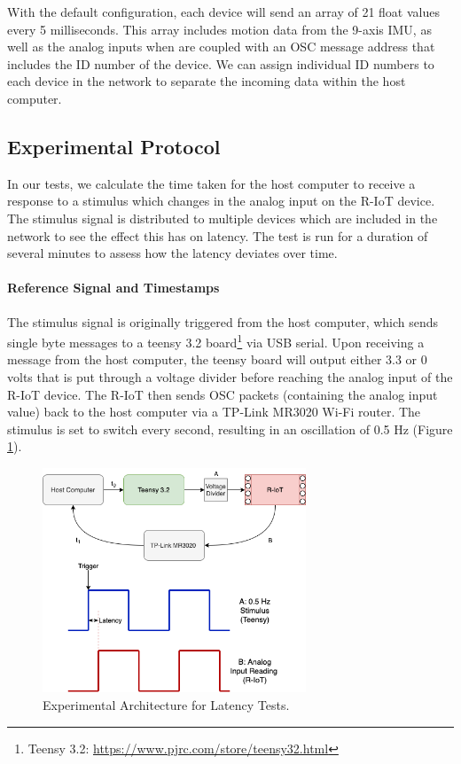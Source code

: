 With the default configuration, each device will send an array of 21 float values every 5 milliseconds. This array includes motion data from the 9-axis IMU, as well as the analog inputs when are coupled with an OSC message address that includes the ID number of the device. We can assign individual ID numbers to each device in the network to separate the incoming data within the host computer.

\subsection{Experimental Protocol}

In our tests, we calculate the time taken for the host computer to receive a response to a stimulus which changes in the analog input on the R-IoT device. The stimulus signal is distributed to multiple devices which are included in the network to see the effect this has on latency. The test is run for a duration of several minutes to assess how the latency deviates over time.

\paragraph{Reference Signal and Timestamps}
The stimulus signal is originally triggered from the host computer, which sends single byte messages to a teensy 3.2 board\footnote{Teensy 3.2: \url{https://www.pjrc.com/store/teensy32.html}} via USB serial. Upon receiving a message from the host computer, the teensy board will output either 3.3 or 0 volts that is put through a voltage divider before reaching the analog input of the R-IoT device. The R-IoT then sends OSC packets (containing the analog input value) back to the host computer via a TP-Link MR3020 Wi-Fi router. The stimulus is set to switch every second, resulting in an oscillation of 0.5 Hz (Figure \ref{fig:latency_fig1}).

\begin{figure}[htbp]
  \centering
    \includegraphics[width=0.7\textwidth]{Chapters/Figures/technical/Latency/figure1.png}
    \caption{Experimental Architecture for Latency Tests.}
    \label{fig:latency_fig1}
\end{figure}

